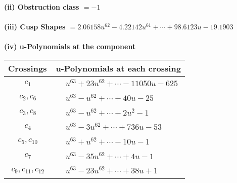 \documentclass[1p]{elsarticle_modified}
\theoremstyle{definition}
\begin{document}
\flushleft \textbf{(ii) Obstruction class $= -1$}\\~\\
\flushleft \textbf{(iii) Cusp Shapes $= 2.06158 u^{62}-4.22142 u^{61}+\cdots+98.6123 u-19.1903$}\\~\\
\newpage\renewcommand{\arraystretch}{1}
\flushleft \textbf{(iv) u-Polynomials at the component}\newline \\
\begin{tabular}{m{50pt}|m{274pt}}
Crossings & \hspace{64pt}u-Polynomials at each crossing \\
\hline $$\begin{aligned}c_{1}\end{aligned}$$&$\begin{aligned}
&u^{63}+23 u^{62}+\cdots-11050 u-625
\end{aligned}$\\
\hline $$\begin{aligned}c_{2},c_{6}\end{aligned}$$&$\begin{aligned}
&u^{63}- u^{62}+\cdots+40 u-25
\end{aligned}$\\
\hline $$\begin{aligned}c_{3},c_{8}\end{aligned}$$&$\begin{aligned}
&u^{63}- u^{62}+\cdots+2 u^2-1
\end{aligned}$\\
\hline $$\begin{aligned}c_{4}\end{aligned}$$&$\begin{aligned}
&u^{63}-3 u^{62}+\cdots+736 u-53
\end{aligned}$\\
\hline $$\begin{aligned}c_{5},c_{10}\end{aligned}$$&$\begin{aligned}
&u^{63}+u^{62}+\cdots-10 u-1
\end{aligned}$\\
\hline $$\begin{aligned}c_{7}\end{aligned}$$&$\begin{aligned}
&u^{63}-35 u^{62}+\cdots+4 u-1
\end{aligned}$\\
\hline $$\begin{aligned}c_{9},c_{11},c_{12}\end{aligned}$$&$\begin{aligned}
&u^{63}-23 u^{62}+\cdots+38 u+1
\end{aligned}$\\
\hline
\end{tabular}\\~\\
\end{document}
